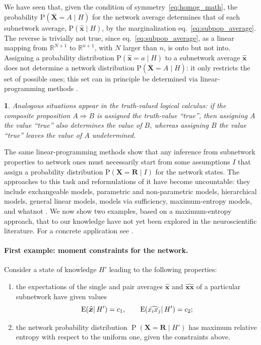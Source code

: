 \documentclass{article}
\newcommand*{\citep}{\parencites}
\theoremstyle{innote}
\newtheorem*{innote}{}
\newcommand*{\av}{\overline} %
\newcommand*{\sav}{\widehat} %
\newcommand*{\yx}{\bm{x}}%
\newcommand*{\yxs}{\sav{\yx}}%
\newcommand*{\yX}{\bm{X}}%
\newcommand*{\yXf}{\av{\yX}}%
\newcommand*{\yR}{\bm{R}}%
\newcommand*{\yH}{\varEta}
\newcommand*{\yHa}{\varEta'}
\newcommand*{\eg}{{e.g.}}
\newcommand*{\limplies}{\mathbin{\Rightarrow}}%
\newcommand*{\cond}%
{\mathpunct{|}}%
\DeclareMathOperator{\pr}{P}%
\newcommand*{\p}{\mathrm{P}}%
\renewcommand*{\|}{\cond}
\newcommand*{\+}{\lor}
\newcommand*{\eqn}{eq.}%
\let\varAlpha A
\let\varBeta B
\let\varEta H
\let\varIota I
\newcommand*{\RR}{\mathbb{R}}
\newcommand*{\E}{\mathrm{E}}
\DeclarePairedDelimiter\expp{(}{)}
\newcommand*{\expe}{\E\expp}%
\begin{document}
We have seen that, given the condition of symmetry~\eqref{eq:homog_math},
the probability $\p(\yXf = A \cond\yH)$ for the network average determines
that of each subnetwork average, $\p(\yxs \cond\yH)$, by the
marginalization \eqn~\eqref{eq:subpop_average}. The reverse is trivially
not true, since \eqn~\eqref{eq:subpop_average}, as a linear mapping from
$\RR^{N+1}$ to $\RR^{n+1}$, with $N$ larger than $n$, is onto but not into.
Assigning a probability distribution $\p(\yxs = a \cond\yH)$ to a
subnetwork average $\yxs$ does not determine a network distribution
$\p(\yXf = A\cond\yH)$: it only restricts the set of possible ones; this
set can in principle be determined via linear-programming methods
\citep{hailperin1965,hailperin1984,hailperin1996,hailperin2006,hailperin2011}.
\begin{innote}
  Analogous situations appear in the truth-valued logical calculus: if the
  composite proposition $\varAlpha\limplies \varBeta$ is assigned the
  truth-value \enquote{true}, then assigning $\varAlpha$ the value
  \enquote{true} also determines the value of $\varBeta$, whereas assigning
  $\varBeta$ the value \enquote{true} leaves the value of $\varAlpha$
  undetermined.
\end{innote}
The same linear-programming methods show that any inference from subnetwork
properties to network ones must necessarily start from some assumptions
$\varIota$ that assign a probability distribution
$\p(\yX = \yR \cond \varIota)$ for the network states. The approaches to
this task and reformulations of it have become uncountable: they include
exchangeable models, parametric and non-parametric models, hierarchical
models, general linear models, models via sufficiency, maximum-entropy
models, and whatnot
\citep[\eg:][]{jeffreys1931_r1973,jeffreys1939_r2003,jaynes1994_r2003,bernardoetal1994,gelmanetal1995_r2014,ghoshetal1997,kallenberg2005,gregory2005,sivia1996_r2006,ferreiraetal2007,dawid2013,damienetal2013}.
We now show two examples, based on a maximum-entropy approach, that to our
knowledge have not yet been explored in the neuroscientific literature. For
a concrete application see \citep{rostamietal2016b}.



\paragraph{First example: moment constraints for the network.}
\label{sec:maxent_moments}
Consider a state of knowledge $\yHa$ leading to the following properties:
\begin{enumerate}[$\yHa$1.]
\item the expectations of the single and pair averages $\yxs$ and
  $\sav{\yx\yx}$ of a particular subnetwork have given values
  \begin{equation}
    \label{eq:constr_ex1}
    \expe{\yxs \cond \yHa} = c_1, \qquad \expe{\sav{x_i x_j}\cond\yHa} = c_2;
  \end{equation}
\item the network probability distribution $\pr(\yX = \yR \cond\yHa)$
  has maximum relative entropy with respect to the uniform one, given the
  constraints above.
\end{enumerate}
\end{document}
